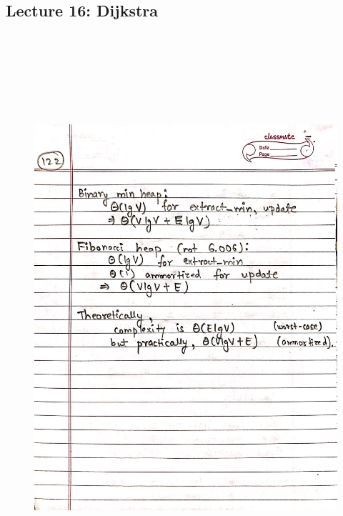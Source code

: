 \newpage
{\color{black} \subsection*{Lecture 16: Dijkstra}}
\begin{figure}[H]
    \centering
    \includegraphics[width=16cm, height=21cm]{"./MIT-6.006/MIT-6006-122"}
\end{figure}

